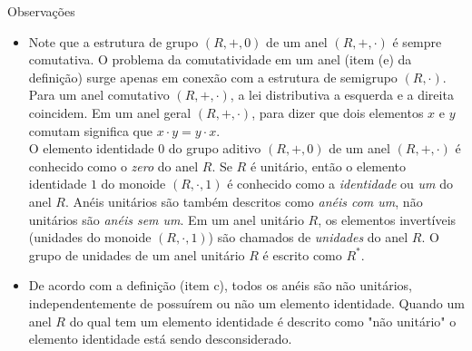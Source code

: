       \begin{mymdframed}{Observações}
         \begin{itemize}
            \item Note que a estrutura de grupo $(R,+,0)$ de um anel $(R,+,\cdot)$ é sempre comutativa. O problema da comutatividade em um anel (item (e) da definição) surge apenas em conexão com a estrutura de semigrupo $(R,\cdot)$. Para um anel comutativo $(R, +, \cdot)$, a lei distributiva a esquerda e a direita coincidem. Em um anel geral $(R,+,\cdot)$, para dizer que dois elementos $x$ e $y$ comutam significa que $x\cdot y = y \cdot x $.\\ 
            O elemento identidade $0$ do grupo aditivo $(R, +, 0)$ de um anel $(R, +, \cdot)$ é conhecido como o \emph{zero} do anel $R$. Se $R$ é unitário, então o elemento identidade $1$ do monoide $(R,\cdot , 1)$ é conhecido como a \emph{identidade} ou \emph{um} do anel $R$. Anéis unitários são também descritos como \emph{anéis com um}, não unitários são \emph{anéis sem um}. Em um anel unitário $R$, os elementos invertíveis (unidades do monoide $(R,\cdot , 1)$) são chamados de \emph{unidades} do anel $R$. O grupo de unidades de um anel unitário $R$ é escrito como $R^{*}.$
            \item De acordo com a definição (item c), todos os anéis são não unitários, independentemente de possuírem ou não um elemento identidade. Quando um anel $R$ do qual tem um elemento identidade é descrito como "não unitário" o elemento identidade está sendo desconsiderado.
         \end{itemize}
      \end{mymdframed}

